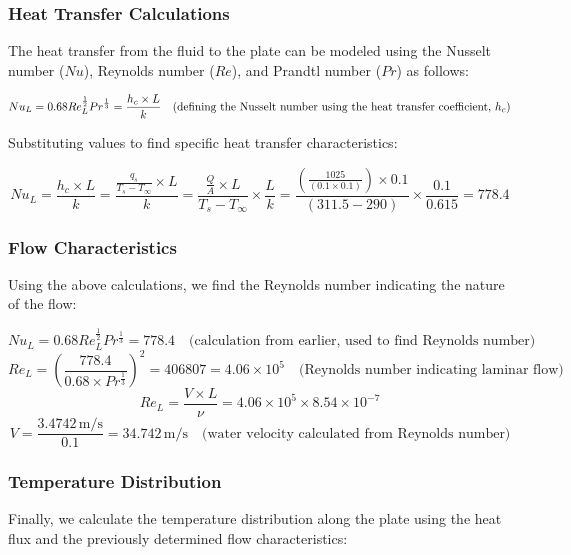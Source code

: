 \documentclass{article}
\numberwithin{equation}{section}
\begin{document}
\subsubsection*{Heat Transfer Calculations}
The heat transfer from the fluid to the plate can be modeled using the Nusselt number ($Nu$), Reynolds number ($Re$), and Prandtl number ($Pr$) as follows:

\begin{equation}
    Nu_L = 0.68 Re_L^{\frac{1}{2}} Pr^{\frac{1}{3}} = \frac{h_c \times L}{k} \quad \text{(defining the Nusselt number using the heat transfer coefficient, \( h_c \))}
\end{equation}

\noindent
Substituting values to find specific heat transfer characteristics:

\begin{equation}
    Nu_L = \frac{h_c \times L}{k} = \frac{\frac{q_s}{T_s - T_{\infty}} \times L}{k} = \frac{\frac{Q}{A} \times L}{T_s - T_{\infty}} \times \frac{L}{k} = \frac{\left( \frac{1025}{(0.1 \times 0.1)} \right) \times 0.1}{(311.5 - 290)} \times \frac{0.1}{0.615} = 778.4
\end{equation}

\subsubsection*{Flow Characteristics}
Using the above calculations, we find the Reynolds number indicating the nature of the flow:

\begin{equation}
    Nu_L = 0.68 Re_L^{\frac{1}{2}} Pr^{\frac{1}{3}} = 778.4 \quad \text{(calculation from earlier, used to find Reynolds number)}
\end{equation}
\begin{equation}
    Re_L = \left( \frac{778.4}{0.68 \times Pr^{\frac{1}{3}}} \right)^{2} = 406807 = 4.06 \times 10^{5} \quad \text{(Reynolds number indicating laminar flow)}
\end{equation}
\begin{equation}
    Re_L = \frac{V \times L}{\nu} = 4.06 \times 10^{5} \times 8.54 \times 10^{-7}
\end{equation}
\begin{equation}
    V = \frac{3.4742 \, \text{m/s}}{0.1} = 34.742 \, \text{m/s} \quad \text{(water velocity calculated from Reynolds number)}
\end{equation}

\subsubsection*{Temperature Distribution}
Finally, we calculate the temperature distribution along the plate using the heat flux and the previously determined flow characteristics:
\end{document}
